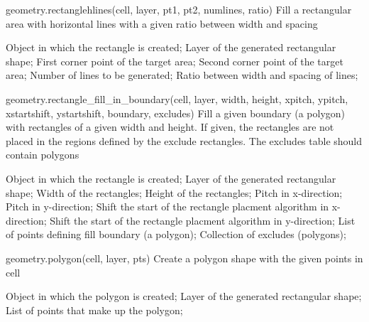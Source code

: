 \begin{APIfunc}{geometry.rectanglehlines(cell, layer, pt1, pt2, numlines, ratio)}
    Fill a rectangular area with horizontal lines with a given ratio between width and spacing
    \begin{APIparameters}
            Object in which the rectangle is created;
            Layer of the generated rectangular shape;
            First corner point of the target area;
            Second corner point of the target area;
            Number of lines to be generated;
            Ratio between width and spacing of lines;
    \end{APIparameters}
\end{APIfunc}
\begin{APIfunc}{geometry.rectangle\_fill\_in\_boundary(cell, layer, width, height, xpitch, ypitch, xstartshift, ystartshift, boundary, excludes)}
    Fill a given boundary (a polygon) with rectangles of a given width and height. If given, the rectangles are not placed in the regions defined by the exclude rectangles. The excludes table should contain polygons
    \begin{APIparameters}
            Object in which the rectangle is created;
            Layer of the generated rectangular shape;
            Width of the rectangles;
            Height of the rectangles;
            Pitch in x-direction;
            Pitch in y-direction;
            Shift the start of the rectangle placment algorithm in x-direction;
            Shift the start of the rectangle placment algorithm in y-direction;
            List of points defining fill boundary (a polygon);
            Collection of excludes (polygons);
    \end{APIparameters}
\end{APIfunc}
\begin{APIfunc}{geometry.polygon(cell, layer, pts)}
    Create a polygon shape with the given points in cell
    \begin{APIparameters}
            Object in which the polygon is created;
            Layer of the generated rectangular shape;
            List of points that make up the polygon;
    \end{APIparameters}
\end{APIfunc}

